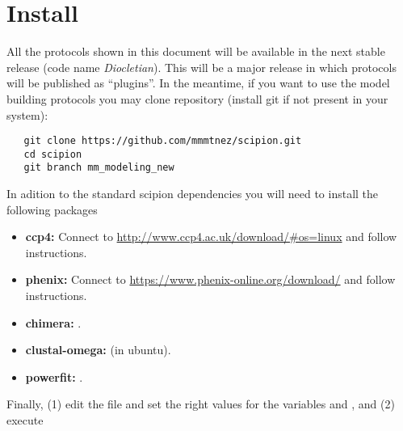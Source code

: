 \section{Install}
  All the protocols shown in this document will be available in the next stable \scipion release (code name \textit{Diocletian}). This will be a major release in which protocols will be published as ``plugins''. In the meantime, if you want to use the model building protocols you may clone \scipion repository (install git if not present in your system):

  \begin{verbatim}
   git clone https://github.com/mmmtnez/scipion.git
   cd scipion
   git branch mm_modeling_new
  \end{verbatim}

  In adition to the standard scipion dependencies you will need to install the following packages
  
  \begin{itemize}
   \item\textbf{ccp4:} Connect to \url{http://www.ccp4.ac.uk/download/#os=linux} and follow instructions.
   \item\textbf{phenix:} Connect to \url{https://www.phenix-online.org/download/} and follow instructions.
   \item\textbf{chimera:}  .
   \item\textbf{clustal-omega:}  (in ubuntu).
   \item\textbf{powerfit:} .
  \end{itemize}

  
  Finally, (1) edit the file  and set the right values for the variables  and , and (2) execute 
